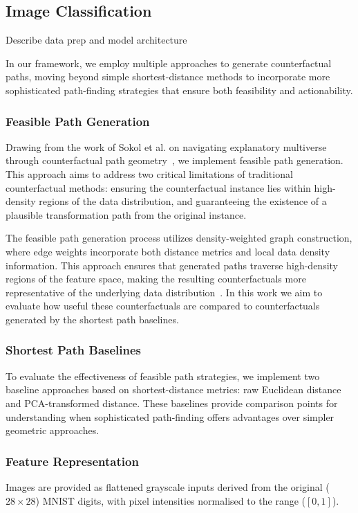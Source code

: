 \documentclass[sigconf,anonymous]{aamas}
\begin{document}
\subsection{Image Classification}
Describe data prep and model architecture


In our framework, we employ multiple approaches to generate counterfactual paths, moving beyond simple shortest-distance methods to incorporate more sophisticated path-finding strategies that ensure both feasibility and actionability. 

\subsubsection{Feasible Path Generation}
Drawing from the work of Sokol et al. on navigating explanatory multiverse through counterfactual path geometry~\cite{sokol2023navigating}, we implement feasible path generation. This approach aims to address two critical limitations of traditional counterfactual methods: ensuring the counterfactual instance lies within high-density regions of the data distribution, and guaranteeing the existence of a plausible transformation path from the original instance.

The feasible path generation process utilizes density-weighted graph construction, where edge weights incorporate both distance metrics and local data density information. This approach ensures that generated paths traverse high-density regions of the feature space, making the resulting counterfactuals more representative of the underlying data distribution~\cite{poyiadzi2020face}. In this work we aim to evaluate how useful these counterfactuals are compared to counterfactuals generated by the shortest path baselines.

\subsubsection{Shortest Path Baselines}

To evaluate the effectiveness of feasible path strategies, we implement two baseline approaches based on shortest-distance metrics: raw Euclidean distance and PCA-transformed distance. These baselines provide comparison points for understanding when sophisticated path-finding offers advantages over simpler geometric approaches.


\subsubsection{Feature Representation}
Images are provided as flattened grayscale inputs derived from the original ($28 \times 28$) MNIST digits, with pixel intensities normalised to the range ($[0, 1]$).
\end{document}
